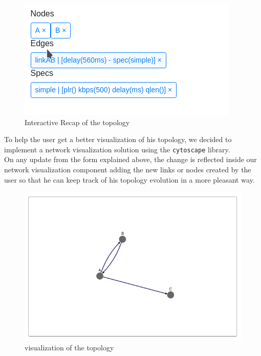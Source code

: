 \documentclass{eplmastersthesis}
\begin{document}
        \begin{figure}[H]
          \centering
          \includegraphics[scale=0.6]{figures/recap_topology.png}
          \caption{\label{recap_topology} Interactive Recap of the topology}
        \end{figure}

        To help the user get a better visualization of his topology, we
        decided to implement a network visualization solution using the
        \texttt{cytoscape} library.\\
        On any update from the form explained above, the change is reflected
        inside our network visualization component adding the new links or
        nodes created by the user so that he can keep track of his topology
        evolution in a more pleasant way.\\

        \begin{figure}[H]
          \centering
          \includegraphics[scale=0.6]{figures/visual_topology.png}
          \caption{\label{visual_topology} visualization of the topology}
        \end{figure}
\end{document}
